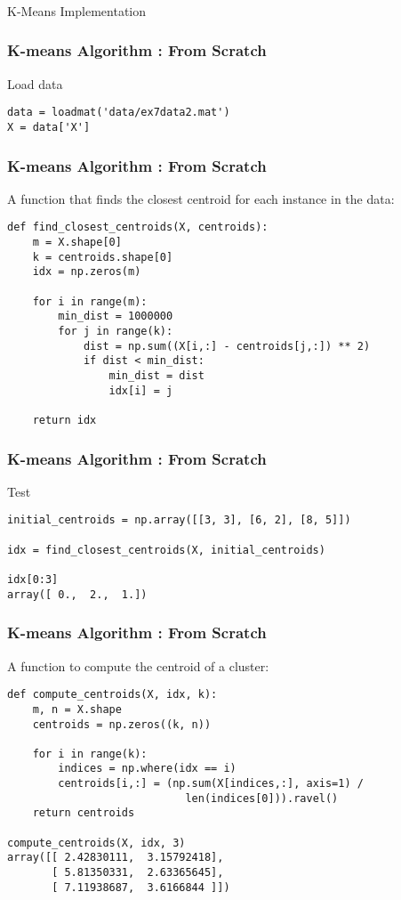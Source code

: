 \begin{frame}[fragile]\frametitle{}
\begin{center}
{\Large K-Means Implementation}
\end{center}
\end{frame}


\begin{frame}[fragile]\frametitle{K-means Algorithm : From Scratch}
Load data
\begin{lstlisting}
data = loadmat('data/ex7data2.mat')
X = data['X']
\end{lstlisting}
\end{frame}

\begin{frame}[fragile]\frametitle{K-means Algorithm : From Scratch}
A function that finds the closest centroid for each instance in the data:
\begin{lstlisting}
def find_closest_centroids(X, centroids):
    m = X.shape[0]
    k = centroids.shape[0]
    idx = np.zeros(m)
    
    for i in range(m):
        min_dist = 1000000
        for j in range(k):
            dist = np.sum((X[i,:] - centroids[j,:]) ** 2)
            if dist < min_dist:
                min_dist = dist
                idx[i] = j
    
    return idx
\end{lstlisting}
\end{frame}

\begin{frame}[fragile]\frametitle{K-means Algorithm : From Scratch}
Test
\begin{lstlisting}
initial_centroids = np.array([[3, 3], [6, 2], [8, 5]])

idx = find_closest_centroids(X, initial_centroids)

idx[0:3]
array([ 0.,  2.,  1.])
\end{lstlisting}

\end{frame}


\begin{frame}[fragile]\frametitle{K-means Algorithm : From Scratch}
A function to compute the centroid of a cluster:
\begin{lstlisting}
def compute_centroids(X, idx, k):
    m, n = X.shape
    centroids = np.zeros((k, n))
    
    for i in range(k):
        indices = np.where(idx == i)
        centroids[i,:] = (np.sum(X[indices,:], axis=1) /
        					len(indices[0])).ravel() 
    return centroids
    
compute_centroids(X, idx, 3)
array([[ 2.42830111,  3.15792418],
       [ 5.81350331,  2.63365645],
       [ 7.11938687,  3.6166844 ]])
\end{lstlisting}
\end{frame}

